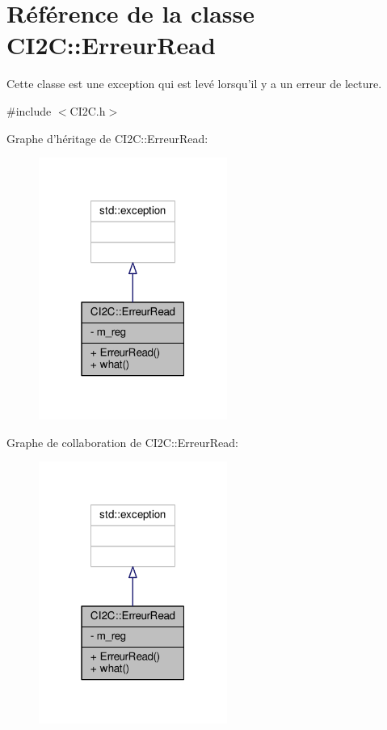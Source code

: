 \hypertarget{classCI2C_1_1ErreurRead}{\section{Référence de la classe C\+I2\+C\+:\+:Erreur\+Read}
\label{classCI2C_1_1ErreurRead}
}


Cette classe est une exception qui est levé lorsqu'il y a un erreur de lecture.  




{\ttfamily \#include $<$C\+I2\+C.\+h$>$}



Graphe d'héritage de C\+I2\+C\+:\+:Erreur\+Read\+:\nopagebreak
\begin{figure}[H]
\begin{center}
\leavevmode
\includegraphics[width=175pt]{classCI2C_1_1ErreurRead__inherit__graph}
\end{center}
\end{figure}


Graphe de collaboration de C\+I2\+C\+:\+:Erreur\+Read\+:\nopagebreak
\begin{figure}[H]
\begin{center}
\leavevmode
\includegraphics[width=175pt]{classCI2C_1_1ErreurRead__coll__graph}
\end{center}
\end{figure}
